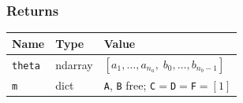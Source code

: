 \documentclass[../main]{subfiles}
\begin{document}
\subsubsection*{Returns}
\begin{center}
\begin{tabular}{lll}
  \toprule
  Name & Type & Value \\
  \midrule
  \texttt{theta} & ndarray & $[a_1,\ldots,a_{n_a},\; b_0,\ldots,b_{n_b-1}]$ \\
  \texttt{m}     & dict    & \texttt{A}, \texttt{B} free; \texttt{C}$=$\texttt{D}$=$\texttt{F}$=[1]$ \\
  \bottomrule
\end{tabular}
\end{center}
\end{document}
